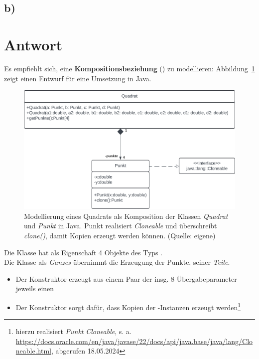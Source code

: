 \subsection*{b)}

\section*{Antwort}

Es empfiehlt sich, eine \textbf{Kompositionsbeziehung} (\cite[49]{Bal05}) zu modellieren: Abbildung~\ref{fig:aufgabe-4-teil-b} zeigt einen Entwurf für eine Umsetzung in Java.\\

\begin{figure}
    \centering
    \includegraphics[scale=0.35]{chapters/aufgabe 4/img/aufgabe4b}
    \caption{Modellierung eines Quadrats als Komposition der Klassen \textit{Quadrat} und \textit{Punkt} in Java. Punkt realisiert \textit{Cloneable} und überschreibt \textit{clone()}, damit Kopien erzeugt werden können. (Quelle: eigene)}
    \label{fig:aufgabe-4-teil-b}
\end{figure}

\noindent
Die Klasse  hat als Eigenschaft 4 Objekte des Typs .\\
Die Klasse als \textit{Ganzes} übernimmt die Erzeugung der Punkte, seiner \textit{Teile}.
    \begin{itemize}
        \item Der Konstruktor  erzeugt aus einem Paar der insg. 8 Übergabeparameter jeweils einen 
        \item Der Konstruktor  sorgt dafür, dass Kopien der -Instanzen erzeugt werden\footnote{
            hierzu realisiert \textit{Punkt} \textit{Cloneable}, s. a. \url{https://docs.oracle.com/en/java/javase/22/docs/api/java.base/java/lang/Cloneable.html}, abgerufen 18.05.2024
        }
    \end{itemize}

